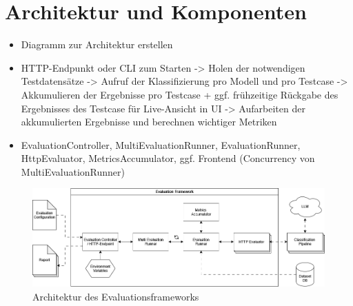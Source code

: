 \section{Architektur und Komponenten}\label{sec:architektur-und-komponenten}

\begin{itemize}
    \item Diagramm zur Architektur erstellen
    \item HTTP-Endpunkt oder CLI zum Starten -> Holen der notwendigen Testdatensätze -> Aufruf der Klassifizierung pro Modell und pro Testcase -> Akkumulieren der Ergebnisse pro Testcase + ggf. frühzeitige Rückgabe des Ergebnisses des Testcase für Live-Ansicht in UI -> Aufarbeiten der akkumulierten Ergebnisse und berechnen wichtiger Metriken
    \item EvaluationController, MultiEvaluationRunner, EvaluationRunner, HttpEvaluator, MetricsAccumulator, ggf. Frontend (Concurrency von MultiEvaluationRunner)
\end{itemize}

\begin{figure}
    \centering
    \includegraphics[width=.7\linewidth]{images/evaluation/evaluation-framework-architecture}
    \caption{Architektur des Evaluationsframeworks}
    \label{fig:evaluation-framework-architecture}
\end{figure}
